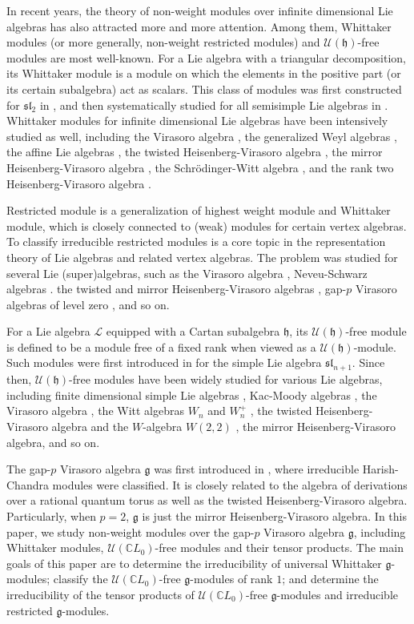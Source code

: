\documentclass[12pt, reqno]{amsart}
\numberwithin{equation}{section}
\numberwithin{equation}{section}
\def\h{\mathfrak{h}}
\def\g{\mathfrak{g}}
\def\U{\mathcal{U}}
\newcommand{\C}{\mathbb C}
\begin{document}
In recent years, the theory of
non-weight modules over infinite dimensional Lie algebras has also attracted more and more attention.
Among them, Whittaker modules (or more generally, non-weight restricted modules) and $\U(\h)$-free modules are most well-known.  For a Lie algebra with a triangular decomposition,  its Whittaker module is a module on which the elements in the positive part (or its certain subalgebra) act as scalars.
This class of modules was first constructed for $\mathfrak{sl}_2$ in \cite{AP},
and then systematically studied for all semisimple Lie algebras in \cite{Kon}.
 Whittaker modules for infinite dimensional Lie algebras have been  intensively studied as well,
including the Virasoro algebra \cite{OW,LGZ}, the generalized Weyl algebras \cite{BO},
the affine Lie algebras \cite{Chr,ALZ}, the twisted Heisenberg-Virasoro algebra \cite{LZ3},
the mirror Heisenberg-Virasoro algebra \cite{GMZ},
the Schr{\"o}dinger-Witt algebra \cite{ZTL}, and the rank two Heisenberg-Virasoro algebra \cite{TWX}.

Restricted module is a generalization of highest weight module and Whittaker module,
which is closely connected to (weak) modules for certain vertex algebras.
To classify irreducible restricted modules is a core topic in the representation theory of Lie algebras and related vertex algebras.
The problem was studied for several Lie (super)algebras, such as the Virasoro algebra \cite{MZ},
Neveu-Schwarz algebras \cite{LPX}.
the twisted and mirror Heisenberg-Virasoro algebras \cite{CG1,Gao,LPXZ,TYZ},
gap-$p$ Virasoro algebras of level zero \cite{GX}, and so on.

For a Lie algebra  $\mathcal L$ equipped with a Cartan subalgebra $\h$, its
$\U(\h)$-free module is defined to be a module free of a fixed rank when viewed as a $\U(\h)$-module.
Such modules were first introduced in \cite{Nil1} for the simple Lie algebra $\mathfrak{sl}_{n+1}$.
Since then, $\U(\h)$-free modules have been widely studied for various Lie algebras,
including finite dimensional simple Lie algebras \cite{Nil2}, Kac-Moody algebras \cite{CTZ},
the Virasoro algebra \cite{LZ2}, the Witt algebras $W_n$ and $W_n^+$ \cite{TZ},
the twisted Heisenberg-Virasoro algebra and the $W$-algebra $W(2,2)$ \cite{CG2},
the mirror Heisenberg-Virasoro algebra\cite{GMZ}, and so on.


The gap-$p$ Virasoro algebra $\g$ was first introduced in \cite{Xu}, where irreducible Harish-Chandra modules were classified.
It is closely related to the algebra of derivations over a rational quantum torus as well as the twisted Heisenberg-Virasoro algebra.
Particularly, when $p=2$, $\g$ is just the mirror Heisenberg-Virasoro algebra.
In this paper, we study non-weight modules over the gap-$p$ Virasoro algebra $\g$,
including Whittaker modules, $\U(\C L_0)$-free modules and their tensor products.
The main goals of this paper are to determine the irreducibility of universal Whittaker $\g$-modules;
classify the $\U(\C L_0)$-free $\g$-modules of rank $1$;
and determine the irreducibility of the tensor products of $\U(\C L_0)$-free $\g$-modules and
irreducible restricted $\g$-modules.
\end{document}
